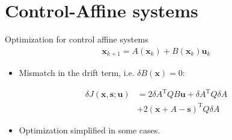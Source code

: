 \documentclass[handout]{beamer}
\newcommand{\state}{\mathbf{x}} %
\newcommand{\traj}{\mathbf{s}} %
\newcommand{\sysInput}{\mathbf{u}} %
\begin{document}
\section{Control-Affine systems}
%
\begin{frame}{Optimization for control affine systems}
\begin{align}
\state_{k+1} = A(\state_{k}) + B(\state_{k})\sysInput_k
\end{align}
\pause
\begin{itemize}
\item Mismatch in the drift term, i.e. $\delta B(\state) = 0$: \pause
\end{itemize}
\begin{equation}
\begin{aligned}
\delta J(\state,\traj;\sysInput) &= 2\delta A^{\mathrm{T}}QB\sysInput + \delta A^{\mathrm{T}}Q \delta A \\
&+ 2(\state + A - \traj)^{\mathrm{T}}Q\delta A 
\end{aligned}
\end{equation} 
\pause
\begin{itemize}
\item Optimization simplified in some cases.
\end{itemize}
\end{frame}
%
\end{document}
